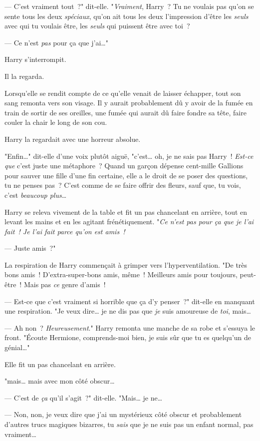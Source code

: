 --- C'est vraiment tout~?" dit-elle. "\emph{Vraiment}, Harry~? Tu ne voulais pas qu'on se sente tous les deux \emph{spéciaux}, qu'on ait tous les deux l'impression d'être les \emph{seuls} avec qui tu voulais être, les \emph{seuls} qui puissent être avec toi~?

--- Ce n'est \emph{pas} pour ça que j'ai…"

Harry s'interrompit.

Il la regarda.

Lorsqu'elle se rendit compte de ce qu'elle venait de laisser échapper, tout son sang remonta vers son visage. Il y aurait probablement dû y avoir de la fumée en train de sortir de ses oreilles, une fumée qui aurait dû faire fondre sa tête, faire couler la chair le long de son cou.

Harry la regardait avec une horreur absolue.

"Enfin…" dit-elle d'une voix plutôt aiguë, "c'est… oh, je ne sais pas Harry~! \emph{Est-ce que} c'est juste une métaphore~? Quand un garçon dépense cent-mille Gallions pour sauver une fille d'une fin certaine, elle a le droit de se poser des questions, tu ne penses pas~? C'est comme de se faire offrir des fleurs, sauf que, tu vois, c'est \emph{beaucoup plus}…

Harry se releva vivement de la table et fit un pas chancelant en arrière, tout en levant les mains et en les agitant frénétiquement. "\emph{Ce n'est pas pour ça que je l'ai fait~! Je l'ai fait parce qu'on est amis~!}

--- Juste amis~?"

La respiration de Harry commençait à grimper vers l'hyperventilation. "De très bons amis~! D'extra-super-bons amis, même~! Meilleurs amis pour toujours, peut-être~! Mais pas \emph{ce} genre d'amis~!

--- Est-ce que c'est vraiment si horrible que ça d'y penser~?" dit-elle en manquant une respiration. "Je veux dire… je ne dis pas que \emph{je} suis amoureuse de \emph{toi}, mais…

--- Ah non~? \emph{Heureusement}." Harry remonta une manche de sa robe et s'essuya le front. "Écoute Hermione, comprends-moi bien, je suis sûr que tu es quelqu'un de génial…"

Elle fit un pas chancelant en arrière.

"mais… mais avec mon côté obscur…

--- C'est de \emph{ça} qu'il s'agit~?" dit-elle. "Mais… je ne…

--- Non, non, je veux dire que j'ai un mystérieux côté obscur et probablement d'autres trucs magiques bizarres, tu \emph{sais} que je ne suis pas un enfant normal, pas vraiment…

